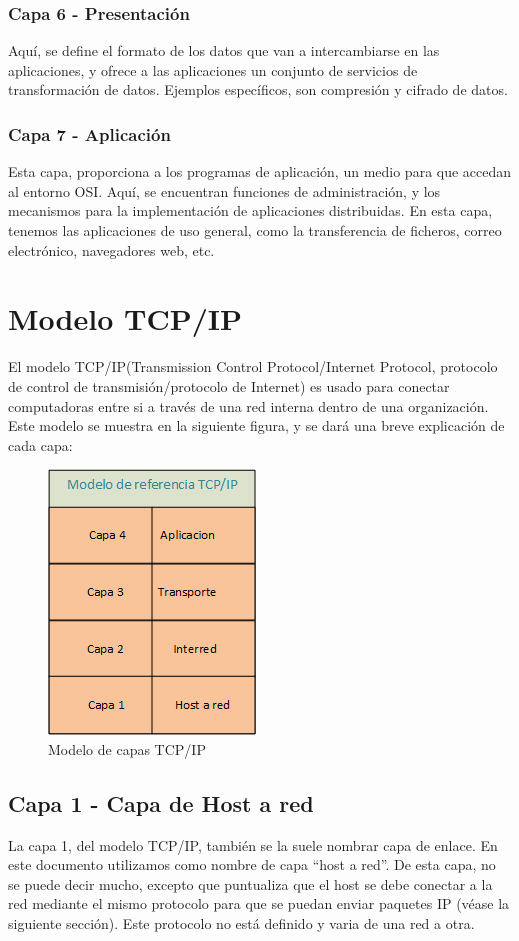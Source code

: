 \subsubsection{Capa 6 - Presentación}
Aquí, se define el formato de los datos que van a intercambiarse en las aplicaciones, y ofrece a las aplicaciones un conjunto de servicios de transformación de datos. Ejemplos específicos, son compresión y cifrado de datos. 


\subsubsection{Capa 7 - Aplicación} 
Esta capa, proporciona a los programas de aplicación, un medio para que accedan al entorno OSI. Aquí, se encuentran funciones de administración, y los mecanismos para la implementación de aplicaciones distribuidas. En esta capa, tenemos las aplicaciones de uso general, como la transferencia de ficheros, correo electrónico, navegadores web, etc. 


\section{Modelo TCP/IP} 
  El modelo TCP/IP(Transmission Control Protocol/Internet Protocol, protocolo de control de transmisión/protocolo de Internet) es usado para conectar computadoras entre si a través de una red interna dentro de una organización. Este modelo se muestra en la siguiente figura, y se dará una breve explicación de cada capa: 
  \begin{figure}[ht]
  	\centering
  	\includegraphics{model_tcpip}
  	\caption{Modelo de capas TCP/IP}
  	\label{fig:model_tcpip}
  \end{figure} 

\subsection{Capa 1 - Capa de Host a red}
La capa 1, del modelo TCP/IP, también se la suele nombrar capa de enlace. En este documento utilizamos como nombre de capa ``host a red''. De esta capa, no se puede decir mucho, excepto que puntualiza que el host se debe conectar a la red mediante el mismo protocolo para que se puedan enviar paquetes IP (véase la siguiente sección). Este protocolo no está definido y varia de una red a otra.
